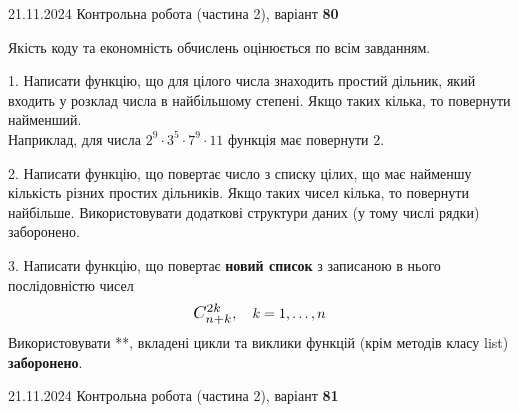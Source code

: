 \documentclass[12pt, ukrainian]{article}
\begin{document}
{{{{{{{{{{{{{{{{{{{{\begin {large}
\end{large}
\newpage
{{21.11.2024 Контрольна робота  (частина 2), варіант  \No \textbf { 80 }\par}}


{
\begin {large}
Якість коду та економність обчислень оцінюється по всім завданням.

\vspace{5mm}

1. Написати функцію, що для цілого числа знаходить простий дільник, який входить у розклад числа в найбільшому степені. Якщо таких кілька, то повернути найменший. \\ Наприклад, для числа $2^{9}{\cdot}3^5{\cdot}7^9{\cdot}11$ функція має повернути $2$.

\vspace{10mm}


2. Написати функцію, що повертає число з списку цілих, що має найменшу кількість різних простих дільників. Якщо таких чисел кілька, то повернути найбільше. Використовувати додаткові структури даних (у тому числі рядки) заборонено.

\vspace{10mm}


3. 
Написати функцію, що повертає \textbf{новий список} з записаною в нього послідовністю чисел
$$\scalebox{1.2}{$C_{n+k}^{2k}$}, \quad k=1,\ldots,n$$
Використовувати **, вкладені цикли та виклики функцій (крім методів класу list) \textbf{заборонено}.

\end{large}
\vspace{25mm}


{{21.11.2024 Контрольна робота  (частина 2), варіант  \No \textbf { 81 }\par}}


}}}}}}}}}}}}}}}}}}}}}
\end{document}
